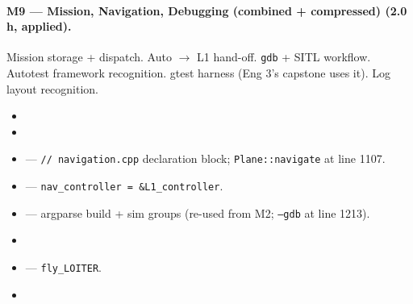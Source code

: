 \documentclass[a4paper,11pt,twoside]{article}
\begin{document}
\paragraph{M9 --- Mission, Navigation, Debugging (combined + compressed) (2.0 h, applied).}
Mission storage + dispatch. Auto $\rightarrow$ L1 hand-off. \texttt{gdb} + SITL workflow. Autotest framework recognition. gtest harness (Eng 3's capstone uses it). Log layout recognition.
\begin{itemize}
  \item {}
  \item {}
  \item {} --- \texttt{// navigation.cpp} declaration block; \texttt{Plane::navigate} at line 1107.
  \item {} --- \texttt{nav\_controller = \&L1\_controller}.
  \item {} --- argparse build + sim groups (re-used from M2; \texttt{--gdb} at line 1213).
  \item {}
  \item {} --- \texttt{fly\_LOITER}.
  \item {}
\end{itemize}
\end{document}
